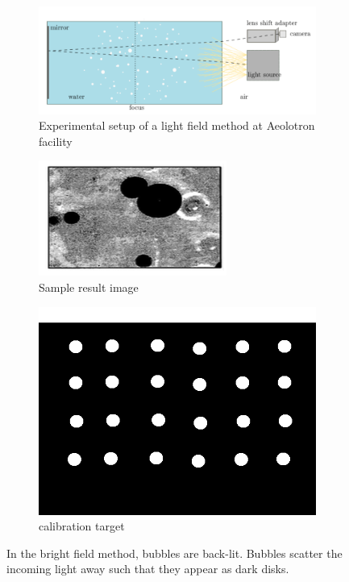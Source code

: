 		\begin{figure}
			\centering
			\begin{subfigure}[t]{0.55\textwidth}
				\includegraphics[scale=.4]{images/bright_field_method.png}
				\caption{Experimental setup of a light field method at Aeolotron facility}
			\end{subfigure}
			
			\begin{subfigure}[t]{0.3\textwidth}
				\centering
				\includegraphics[scale=0.5]{images/bright_field_result.png}
				\caption{Sample result image}
			\end{subfigure}%
			\begin{subfigure}[t]{0.3\textwidth}
				\centering
				\includegraphics[scale=0.15]{images/bright_field_calibration_target.png}
				\caption{calibration target}
				\label{subfig:calib_target}
			\end{subfigure}
			
			\caption{In the bright field method, bubbles are back-lit. Bubbles scatter the incoming light away such that they appear as dark disks. }
			\label{fig:bright_field}
		\end{figure}		
	
